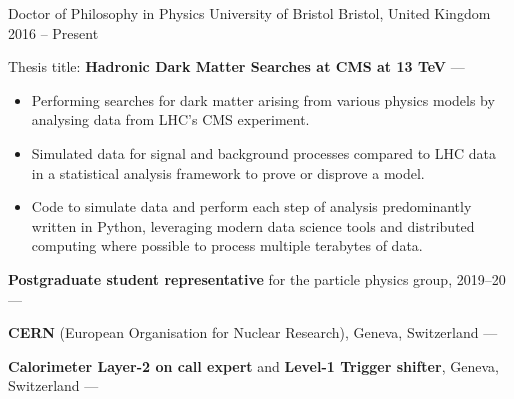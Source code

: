 
\newcommand{\vpaddingEduNorm}{\vspace{1mm}} %
\newcommand{\vpaddingEduSubpoint}{\vspace{0.75mm}} %


\begin{cventries}
    \cventry
        {Doctor of Philosophy in Physics} %
        {University of Bristol} %
        {Bristol, United Kingdom} %
        {2016 -- Present} %
        {
        \begin{cvitems} %
            \item {Thesis title: \textbf{Hadronic Dark Matter Searches at CMS at 13 TeV} --- }
            \vpaddingEduSubpoint
            \begin{itemize}
                \item[\bullet]{Performing searches for dark matter arising from various physics models by analysing data from LHC's CMS experiment.}
                \vpaddingEduSubpoint
                \item[\bullet]{Simulated data for signal and background processes compared to LHC data in a statistical analysis framework to prove or disprove a model.}
                \vpaddingEduSubpoint
                \item[\bullet]{Code to simulate data and perform each step of analysis predominantly written in Python, leveraging modern data science tools and distributed computing where possible to process multiple terabytes of data.}
            \end{itemize}
            \vpaddingEduNorm
            \item {\textbf{Postgraduate student representative} for the particle physics group, 2019--20 --- }
            \vpaddingEduNorm
            \item {\textbf{CERN} (European Organisation for Nuclear Research), Geneva, Switzerland --- }
            \vpaddingEduNorm
            \item {\textbf{Calorimeter Layer-2 on call expert} and \textbf{Level-1 Trigger shifter}, Geneva, Switzerland --- }

\end{cvitems}}
\end{cventries}
